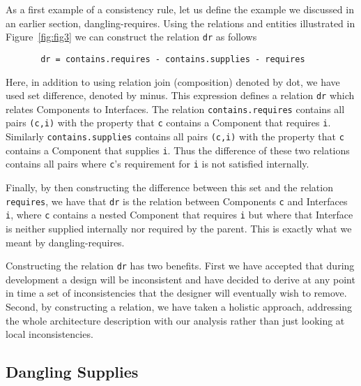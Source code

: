 \documentclass{llncs}
\begin{document}
\noindent As a first example of a consistency rule, let us define the example we discussed in an earlier section, dangling-requires. Using the relations and entities illustrated in Figure~\ref{fig:fig3} we can construct the relation {\small\verb$dr$} as follows
\begin{small}
\begin{verbatim}
       dr = contains.requires - contains.supplies - requires 
\end{verbatim}
\end{small}
Here, in  addition to using relation join (composition) denoted by dot, we have used set difference, denoted by minus.
This expression defines a relation {\small\verb$dr$} which relates Components to Interfaces. The relation {\small\verb$contains.requires$} contains all pairs {\small\verb$(c,i)$} with the property that {\small\verb$c$} contains a Component that requires {\small\verb$i$}. Similarly {\small\verb$contains.supplies$} contains all pairs {\small\verb$(c,i)$} with the property that {\small\verb$c$} contains a Component that supplies {\small\verb$i$}. Thus the difference of these two relations contains all pairs where {\small\verb$c$}'s requirement for {\small\verb$i$} is not satisfied internally. 

Finally, by then constructing the difference between this set and the relation {\small\verb$requires$}, we have that {\small\verb$dr$} is the relation between Components {\small\verb$c$} and Interfaces {\small\verb$i$}, where {\small\verb$c$} contains a nested Component that requires {\small\verb$i$} but where that Interface is neither supplied internally nor required by the parent. This is exactly what we meant by dangling-requires.

Constructing the relation {\small\verb$dr$} has two benefits. First we have accepted that during development a design will be inconsistent and have decided to derive at any point in time a set of inconsistencies that the designer will eventually wish to remove. Second, by constructing a relation, we have taken a holistic approach, addressing the whole architecture description with our analysis rather than just looking at local inconsistencies. 

\subsection{Dangling Supplies}
\end{document}
